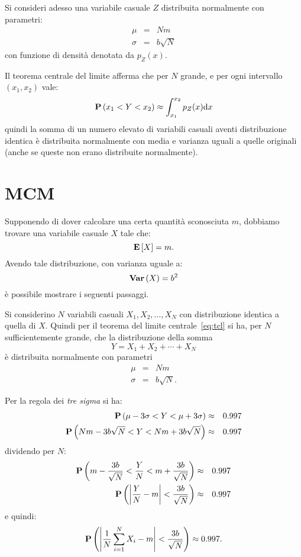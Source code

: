 Si consideri adesso una variabile casuale $Z$ distribuita normalmente
con parametri:
\begin{eqnarray*}
  \mu&=&Nm\\
  \sigma&=&b\sqrt{N}
\end{eqnarray*}
con funzione di densit\`a denotata da $p_Z(x)$.

Il teorema centrale del limite afferma che per $N$ grande, e per ogni
intervallo $(x_1,x_2)$ vale:
\begin{equation}\label{eq:tcl}
  \mathrm{\textbf{P}}\left(x_1<Y<x_2\right)\approx\int_{x_1}^{x_2}p_Z(x) \mathrm{d} x
\end{equation}
quindi la somma di un numero elevato di variabili
casuali aventi distribuzione identica \`e distribuita normalmente con
media e varianza uguali a quelle originali (anche se queste non erano
distribuite normalmente).

\section{\acf{MCM}}
Supponendo di dover calcolare una certa quantit\`a sconosciuta $m$,
dobbiamo trovare una variabile casuale $X$ tale che:
\begin{equation*}
  \mathrm{\textbf{E}}\left[X\right] = m.
\end{equation*}
Avendo tale distribuzione, con varianza uguale a:
\begin{equation*}
  \mathrm{\textbf{Var}}\left(X\right) = b^2
\end{equation*}
 \`e possibile mostrare i seguenti passaggi.

Si considerino $N$ variabili casuali $X_1,X_2,\dots,X_N$ con
distribuzione identica a quella di $X$. Quindi per il teorema del
limite centrale~\eqref{eq:tcl} si ha, per $N$ sufficientemente grande, che la
distribuzione della somma
\begin{equation*}
  Y=X_1+X_2+\cdots+X_N
\end{equation*}
\`e distribuita normalmente con parametri
\begin{eqnarray*}
  \mu &=& Nm\\
  \sigma&=&b\sqrt{N}.
\end{eqnarray*}

Per la regola dei \emph{tre sigma} si ha:
\begin{eqnarray*}
  \mathrm{\textbf{P}}\left(\mu-3\sigma < Y <\mu +3\sigma\right)&\approx& 0.997\\
  \mathrm{\textbf{P}}\left(Nm-3b\sqrt{N} < Y < Nm+3b\sqrt{N}\right)&\approx& 0.997
\end{eqnarray*}
dividendo per $N$:
\begin{eqnarray*}
  \mathrm{\textbf{P}}\left(m-\frac{3b}{\sqrt{N}} < \frac{Y}{N} <
    m+\frac{3b}{\sqrt{N}}\right)&\approx& 0.997\\
  \mathrm{\textbf{P}}\left(\left|\frac{Y}{N}-m\right| <\frac{3b}{\sqrt{N}}\right)&\approx& 0.997
\end{eqnarray*}
e quindi:
\begin{equation}\label{eq:mc}
  \mathrm{\textbf{P}}\left(\left|\frac{1}{N}\sum_{i=1}^NX_i-m\right| <\frac{3b}{\sqrt{N}}\right)\approx 0.997.
\end{equation}

